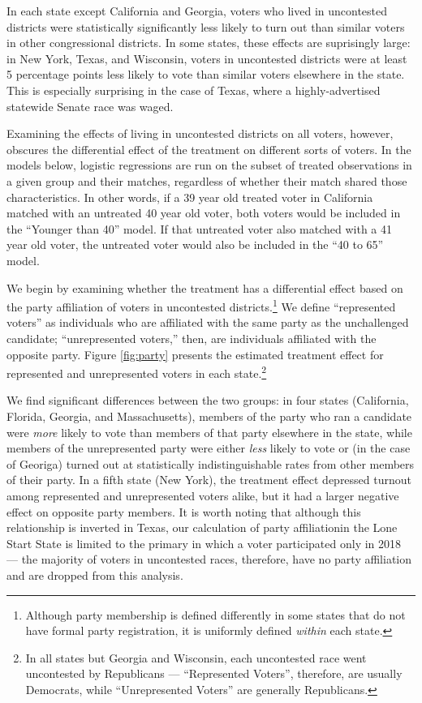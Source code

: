 \documentclass[
  12pt,
]{article}
\begin{document}
In each state except California and Georgia, voters who lived in uncontested districts were statistically significantly less likely to turn out than similar voters in other congressional districts. In some states, these effects are suprisingly large: in New York, Texas, and Wisconsin, voters in uncontested districts were at least 5 percentage points less likely to vote than similar voters elsewhere in the state. This is especially surprising in the case of Texas, where a highly-advertised statewide Senate race was waged.

Examining the effects of living in uncontested districts on all voters, however, obscures the differential effect of the treatment on different sorts of voters. In the models below, logistic regressions are run on the subset of treated observations in a given group and their matches, regardless of whether their match shared those characteristics. In other words, if a 39 year old treated voter in California matched with an untreated 40 year old voter, both voters would be included in the ``Younger than 40'' model. If that untreated voter also matched with a 41 year old voter, the untreated voter would also be included in the ``40 to 65'' model.

We begin by examining whether the treatment has a differential effect based on the party affiliation of voters in uncontested districts.\footnote{Although party membership is defined differently in some states that do not have formal party registration, it is uniformly defined \emph{within} each state.} We define ``represented voters'' as individuals who are affiliated with the same party as the unchallenged candidate; ``unrepresented voters,'' then, are individuals affiliated with the opposite party. Figure \ref{fig:party} presents the estimated treatment effect for represented and unrepresented voters in each state.\footnote{In all states but Georgia and Wisconsin, each uncontested race went uncontested by Republicans --- ``Represented Voters'', therefore, are usually Democrats, while ``Unrepresented Voters'' are generally Republicans.}

We find significant differences between the two groups: in four states (California, Florida, Georgia, and Massachusetts), members of the party who ran a candidate were \emph{more} likely to vote than members of that party elsewhere in the state, while members of the unrepresented party were either \emph{less} likely to vote or (in the case of Georiga) turned out at statistically indistinguishable rates from other members of their party. In a fifth state (New York), the treatment effect depressed turnout among represented and unrepresented voters alike, but it had a larger negative effect on opposite party members. It is worth noting that although this relationship is inverted in Texas, our calculation of party affiliationin the Lone Start State is limited to the primary in which a voter participated only in 2018 --- the majority of voters in uncontested races, therefore, have no party affiliation and are dropped from this analysis.
\end{document}
